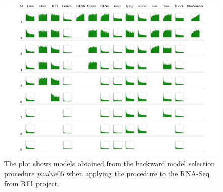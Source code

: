 \documentclass[12pt, letter]{article}\usepackage[]{graphicx}\usepackage[]{color}
\begin{document}
\begin{figure}
\centering
\includegraphics[scale = 0.22]{PlotG9P2PairedEndCBCpvalue05.png}
\caption{The plot shows models obtained from the backward model selection procedure $pvalue05$ when applying the procedure to  the RNA-Seq from RFI project.}
\label{realdataplotpvalue05}
\end{figure}
\end{document}
